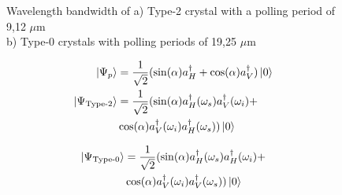 \documentclass[serif,8pt]{beamer}
\begin{document}
{{\begin{frame}[t]
	\begin{figure}[!ht]
	  \centering
	  \caption{Wavelength bandwidth of a) Type-2 crystal with a polling period of 9,12 $\mu$m\\ b) Type-0 crystals with polling periods of 19,25 $\mu$m}
	  \quad
	  \pause
	  \label{fig:CompT0a2}
	\end{figure}
	\pause
	\tiny
	\begin{minipage}[t]{0.48\textwidth}
		\begin{equation}
		\begin{aligned}
			\ket{\Psi_{p}} &= \frac{1}{\sqrt{2}}(\sin(\alpha)a_{H}^{\dagger}+\cos(\alpha)a_{V}^{\dagger})\ket{0}\\
			\ket{\Psi_{\text{Type-2}}} &= \frac{1}{\sqrt{2}}(\sin(\alpha)a_{H}^{\dagger}(\omega_s)a_{V}^{\dagger}(\omega_i)+\\
								&\cos(\alpha)a_{V}^{\dagger}(\omega_i)a_{H}^{\dagger}(\omega_s))\ket{0}\\
		\end{aligned}
		\end{equation}
	\end{minipage}
	\begin{minipage}[t]{0.48\textwidth}
	\begin{equation*}
		\begin{aligned}
			\ket{\Psi_{\text{Type-0}}} &= \frac{1}{\sqrt{2}}(\sin(\alpha)a_{H}^{\dagger}(\omega_s)a_{H}^{\dagger}(\omega_i)+\\
									   &\cos(\alpha)a_{V}^{\dagger}(\omega_i)a_{V}^{\dagger}(\omega_s))\ket{0}
		\end{aligned}
	\end{equation*}
	\end{minipage}
	\normalsize
\end{frame}

}}
\end{document}
